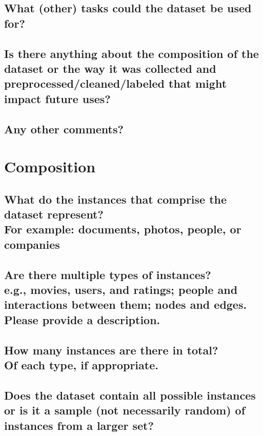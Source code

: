 \documentclass[letterpaper, 10 pt, conference]{ieeeconf}  %
\newcommand{\subtitle}[1]{{\\ \small \normalfont \color{purple} #1}}
\begin{document}
\subsection{What (other) tasks could the dataset be used for?}



\subsection{Is there anything about the composition of the dataset or the way it was collected and preprocessed/cleaned/labeled that might impact future uses?}



\subsection{Any other comments?}

\lipsum[1]

\section{Composition}

\subsection{What do the instances that comprise the dataset represent? \subtitle{For example: documents, photos, people, or companies}}

\lipsum[1]

\subsection{Are there multiple types of instances? \subtitle{e.g., movies, users, and ratings; people and interactions between them; nodes and edges. Please provide a description.}}

\lipsum[1]

\subsection{How many instances are there in total? \subtitle{Of each type, if appropriate.}}

\lipsum[1]

\subsection{Does the dataset contain all possible instances or is it a sample (not necessarily random) of instances from a larger set?}
\end{document}
